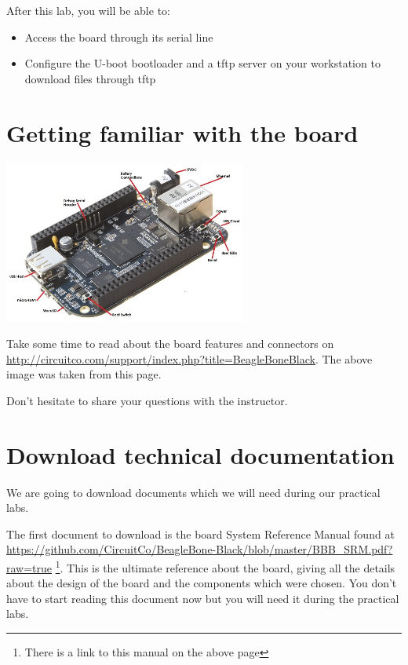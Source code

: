 
After this lab, you will be able to:
\begin{itemize}
\item Access the board through its serial line
\item Configure the U-boot bootloader and a tftp server
      on your workstation to download files through tftp
\end{itemize}

\section{Getting familiar with the board}

\begin{center}
\includegraphics[width=8cm]{labs/kernel-board-setup/beaglebone-black-connectors.jpg}
\end{center}

Take some time to read about the board features and connectors on
\url{http://circuitco.com/support/index.php?title=BeagleBoneBlack}. The
above image was taken from this page.

Don't hesitate to share your questions with the instructor.

\section{Download technical documentation}

We are going to download documents which we will need during our
practical labs.

The first document to download is the board System Reference Manual found at 
\url{https://github.com/CircuitCo/BeagleBone-Black/blob/master/BBB_SRM.pdf?raw=true}
\footnote{There is a link to this manual on the above page}.
This is the ultimate reference about the board, giving all the details
about the design of the board and the components which were chosen.
You don't have to start reading this document now but you will need it
during the practical labs.


